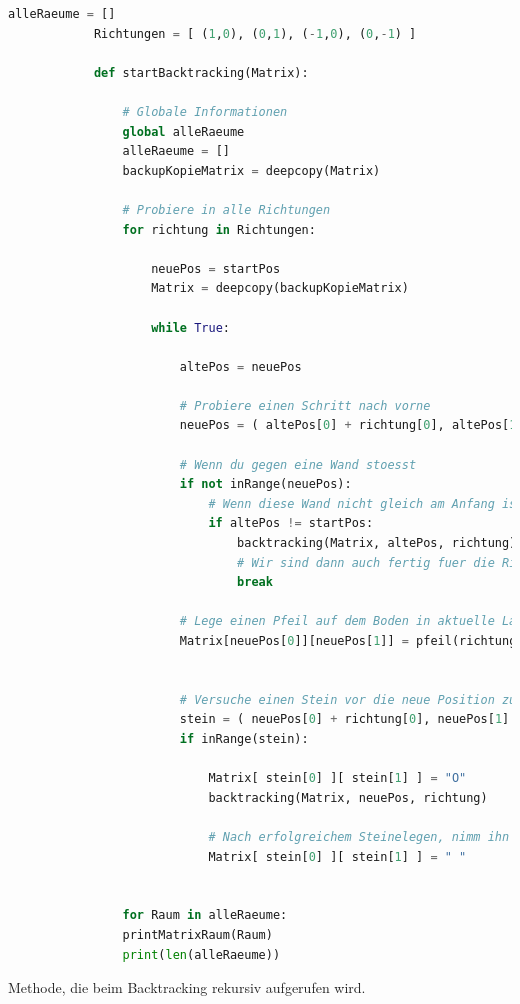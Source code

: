 \documentclass[a4paper,10pt,ngerman]{scrartcl}
\begin{document}
		\begin{lstlisting}[language=Python]
			alleRaeume = []
			Richtungen = [ (1,0), (0,1), (-1,0), (0,-1) ]
			
			def startBacktracking(Matrix):
			
				# Globale Informationen
				global alleRaeume
				alleRaeume = []
				backupKopieMatrix = deepcopy(Matrix)
				
				# Probiere in alle Richtungen
				for richtung in Richtungen:
				
					neuePos = startPos
					Matrix = deepcopy(backupKopieMatrix)
					
					while True:
					
						altePos = neuePos
						
						# Probiere einen Schritt nach vorne
						neuePos = ( altePos[0] + richtung[0], altePos[1] + richtung[1] )
						
						# Wenn du gegen eine Wand stoesst
						if not inRange(neuePos):
							# Wenn diese Wand nicht gleich am Anfang ist, dann backtracke
							if altePos != startPos:
								backtracking(Matrix, altePos, richtung)
								# Wir sind dann auch fertig fuer die Richtung
								break
						
						# Lege einen Pfeil auf dem Boden in aktuelle Laufrichtung
						Matrix[neuePos[0]][neuePos[1]] = pfeil(richtung)
						
						
						# Versuche einen Stein vor die neue Position zu legen und starte Backtracking
						stein = ( neuePos[0] + richtung[0], neuePos[1] + richtung[1] )
						if inRange(stein):
						
							Matrix[ stein[0] ][ stein[1] ] = "O"
							backtracking(Matrix, neuePos, richtung)
							
							# Nach erfolgreichem Steinelegen, nimm ihn wieder weg und lauf weiter in die Richtung
							Matrix[ stein[0] ][ stein[1] ] = " "
				
				
				for Raum in alleRaeume:
				printMatrixRaum(Raum)
				print(len(alleRaeume))
		\end{lstlisting}
		
		Methode, die beim Backtracking rekursiv aufgerufen wird.
		
\end{document}
